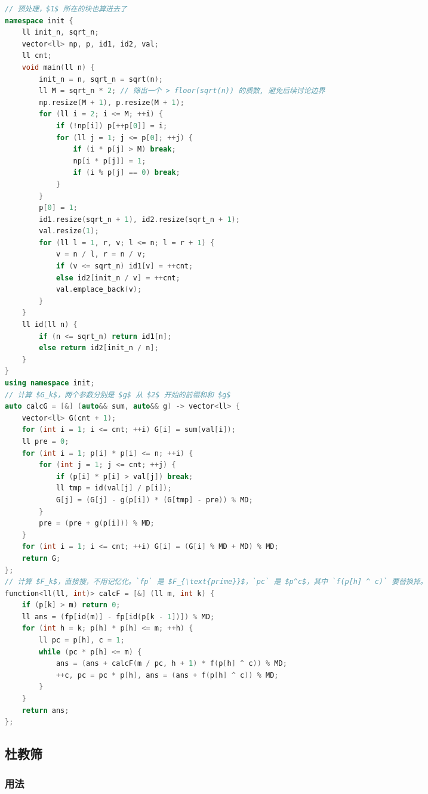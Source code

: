 \documentclass[10pt]{ctexart}
\begin{document}
\begin{multicols}{3}
\begin{lstlisting}[language={C++}]
// 预处理，$1$ 所在的块也算进去了
namespace init {
    ll init_n, sqrt_n;
    vector<ll> np, p, id1, id2, val;
    ll cnt;
    void main(ll n) {
        init_n = n, sqrt_n = sqrt(n);
        ll M = sqrt_n * 2; // 筛出一个 > floor(sqrt(n)) 的质数, 避免后续讨论边界
        np.resize(M + 1), p.resize(M + 1);
        for (ll i = 2; i <= M; ++i) {
            if (!np[i]) p[++p[0]] = i;
            for (ll j = 1; j <= p[0]; ++j) {
                if (i * p[j] > M) break;
                np[i * p[j]] = 1;
                if (i % p[j] == 0) break;
            }
        }
        p[0] = 1;
        id1.resize(sqrt_n + 1), id2.resize(sqrt_n + 1);
        val.resize(1);
        for (ll l = 1, r, v; l <= n; l = r + 1) {
            v = n / l, r = n / v;
            if (v <= sqrt_n) id1[v] = ++cnt;
            else id2[init_n / v] = ++cnt;
            val.emplace_back(v);
        }
    }
    ll id(ll n) {
        if (n <= sqrt_n) return id1[n];
        else return id2[init_n / n];
    }
}
using namespace init;
// 计算 $G_k$，两个参数分别是 $g$ 从 $2$ 开始的前缀和和 $g$
auto calcG = [&] (auto&& sum, auto&& g) -> vector<ll> {
    vector<ll> G(cnt + 1);
    for (int i = 1; i <= cnt; ++i) G[i] = sum(val[i]);
    ll pre = 0;
    for (int i = 1; p[i] * p[i] <= n; ++i) {
        for (int j = 1; j <= cnt; ++j) {
            if (p[i] * p[i] > val[j]) break;
            ll tmp = id(val[j] / p[i]);
            G[j] = (G[j] - g(p[i]) * (G[tmp] - pre)) % MD;
        }
        pre = (pre + g(p[i])) % MD;
    }
    for (int i = 1; i <= cnt; ++i) G[i] = (G[i] % MD + MD) % MD;
    return G;
};
// 计算 $F_k$，直接搜，不用记忆化。`fp` 是 $F_{\text{prime}}$，`pc` 是 $p^c$，其中 `f(p[h] ^ c)` 要替换掉。
function<ll(ll, int)> calcF = [&] (ll m, int k) {
    if (p[k] > m) return 0;
    ll ans = (fp[id(m)] - fp[id(p[k - 1])]) % MD;
    for (int h = k; p[h] * p[h] <= m; ++h) {
        ll pc = p[h], c = 1;
        while (pc * p[h] <= m) {
            ans = (ans + calcF(m / pc, h + 1) * f(p[h] ^ c)) % MD;
            ++c, pc = pc * p[h], ans = (ans + f(p[h] ^ c)) % MD;
        }
    }
    return ans;
};
\end{lstlisting}

    \subsection{杜教筛}\label{ux675cux6559ux7b5b}

    \subsubsection{用法}\label{ux7528ux6cd5-14}


\end{multicols}
\end{document}
